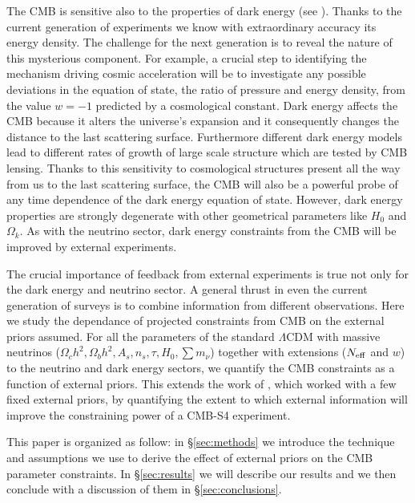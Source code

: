 \documentclass[aps,prd,reprint,superscriptaddress]{revtex4-1}
\newcommand\refsec[1]{\S\ref{sec:#1}}
\begin{document}
The CMB is sensitive also to the properties of dark energy (see \cite{2010MNRAS.405.2639J}). Thanks to the current generation of experiments we know with extraordinary accuracy its energy density. The challenge for the next generation is to reveal the nature of this mysterious component. For example, a crucial step to identifying the mechanism driving cosmic acceleration will be to investigate any possible deviations in the equation of state, the ratio of pressure and energy density, from the value $w=-1$ predicted by a cosmological constant. 
Dark energy affects the CMB because it alters the universe's expansion and it consequently changes the distance to the last scattering surface. Furthermore different dark energy models lead to different rates of growth of large scale structure which are tested by CMB lensing. Thanks to this sensitivity to cosmological structures present all the way from us to the last scattering surface, the CMB will also be a powerful probe of any time dependence of the dark energy equation of state.
However, dark energy properties are strongly degenerate with other geometrical parameters like $H_{0}$ and $\Omega_{k}$. As with the neutrino sector, dark energy constraints from the CMB 
will be improved by external experiments.

The crucial importance of feedback from external experiments is true not only for the dark energy and neutrino sector. A general thrust in even the current generation of surveys is to combine information from different observations. %
Here we study the dependance of projected constraints from CMB on the external priors assumed.  For all the parameters of the standard $\Lambda$CDM with massive neutrinos ($\Omega_ch^2, \Omega_bh^2, A_s, n_s, \tau, H_0, \sum m_\nu$) together with extensions ($N_{\rm eff}$ and $w$) to the neutrino and dark energy sectors, we quantify the CMB constraints as a function of external priors. This extends the work of \citet{wu:2014}, which worked with a few fixed external priors, by quantifying the extent to which external information will improve the constraining power of a CMB-S4 experiment.

This paper is organized as follow: in \refsec{methods} we introduce the technique and assumptions we use to derive the effect of external priors on the CMB parameter constraints. In \refsec{results} we will describe our results and we then conclude with a discussion of them in \refsec{conclusions}.
\end{document}
